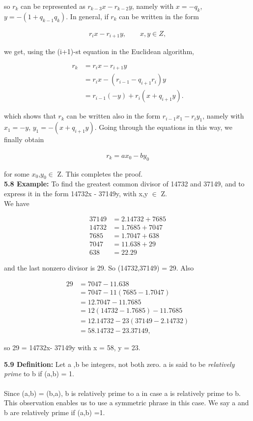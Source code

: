 \documentclass{amsbook}
\begin{document}
so $r_{k}$ can be represented as $r_{k-3}x-r_{k-2}y$, namely with $x=-q_{k}$, $y=-(1+q_{k-1}q_{k})$. In general, if $r_{k}$ can be written in the form

\begin{align*}
r_{i}x-r_{i+1}y, \qquad x,y\in Z,
\end{align*}

we get, using the (i+1)-st equation in the Euclidean algorithm,

\begin{align*}
r_{k}&=r_{i}x-r_{i+1}y\\
&=r_{i}x-(r_{i-1}-q_{i+1}r_{i})y\\
&=r_{i-1}(-y)+r_{i}(x+q_{i+1}y).
\end{align*}

which shows that $r_{k}$ can be written also in the form $r_{i-1}x_{1}-r_{i}y_{1}$, namely with $x_{1}=-y$, $y_{1}=-(x+q_{i+1}y)$. Going through the equations in this way, we finally obtain

\begin{align*}
r_{k}=ax_{0}-by_{0}
\end{align*}

for some $x_{0}$,$y_{0}\in$ Z. This completes the proof.\\

\textbf{5.8 Example: } 
 To find the greatest common divisor of 14732 and 37149, and to express it in the form 14732x - 37149y, with x,y $\in$ Z.\\
We have

\begin{align*}
37149&=2.14732+7685\\
14732&=1.7685+7047\\
7685&=1.7047+638\\
7047&=11.638+29\\
638&=22.29
\end{align*}

and the last nonzero divisor is 29. So (14732,37149) = 29. Also

\begin{align*}
29&=7047-11.638\\
&=7047-11(7685-1.7047)\\
&=12.7047-11.7685\\
&=12(14732-1.7685)-11.7685\\
&=12.14732 - 23(37149 - 2.14732)\\
&=58.14732 - 23.37149,
\end{align*}

so 29 = 14732x- 37149y with x = 58, y = 23.

\textbf{5.9 Definition: }
  Let a ,b be integers, not both zero. a is said to be \textit{relatively prime} to b if (a,b) = 1.\\\\
Since (a,b) = (b,a), b is relatively prime to a in case a is relatively prime to b. This observation enables us to use a symmetric phrase in this case. We say a and b are relatively prime if (a,b) =1. 

\end{document}
